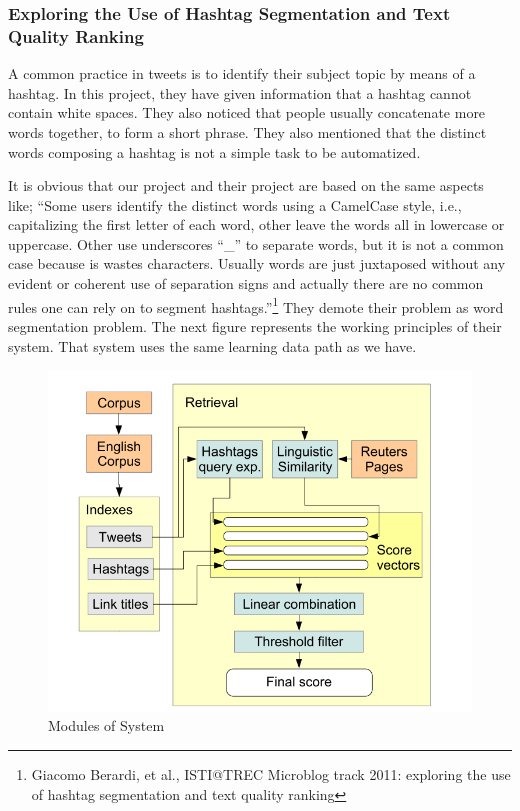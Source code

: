 \documentclass[12pt]{comjnl}
\begin{document}
\subsubsection{Exploring the Use of Hashtag Segmentation and Text Quality Ranking}
A common practice in tweets is to identify their subject topic by means of a hashtag. In this project, they have given information that a hashtag cannot contain white spaces. They also noticed that people usually concatenate more words together, to form a short phrase. They also mentioned that the distinct words composing a hashtag is not a simple task to be automatized. 

It is obvious that our project and their project are based on the same aspects like; 
``Some users identify the distinct words using a CamelCase style, i.e., capitalizing
the first letter of each word, other leave the words all in lowercase or uppercase. Other use
underscores “\_” to separate words, but it is not a common case because is wastes characters.
Usually words are just juxtaposed without any evident or coherent use of separation signs
and actually there are no common rules one can rely on to segment hashtags.''\footnote{Giacomo Berardi, et al., ISTI@TREC Microblog track 2011: exploring the use of hashtag segmentation and text quality ranking}
They demote their problem as word segmentation problem. The next figure represents the working principles of their system. That system uses the same learning data path as we have.

\begin{figure}[htbp]
\centering
\includegraphics[width=5in]{paper1_2.png}
\caption{Modules of System}\label{fig:paper1}
\end{figure}
\end{document}
